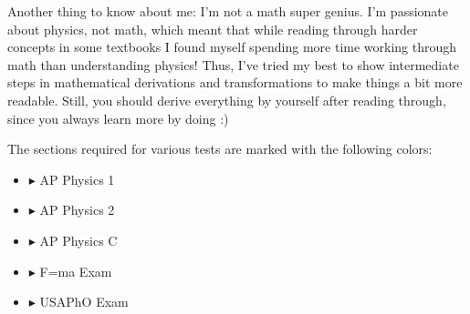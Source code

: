 \par Another thing to know about me: I'm not a math super genius. I'm passionate about physics, not math, which meant that while reading through harder concepts in some textbooks I found myself spending more time working through math than understanding physics! Thus, I've tried my best to show intermediate steps in mathematical derivations and transformations to make things a bit more readable. Still, you should derive everything by yourself after reading through, since you always learn more by doing :)
\par The sections required for various tests are marked with the following colors:
\begin{itemize}
\color{OrangeRed}
\item{$\blacktriangleright$} AP Physics 1
\color{RoyalBlue}
\item{$\blacktriangleright$} AP Physics 2
\color{PineGreen}
\item{$\blacktriangleright$} AP Physics C
\color{Goldenrod}
\item{$\blacktriangleright$} F=ma Exam
\color{Orchid}
\item{$\blacktriangleright$} USAPhO Exam
\end{itemize}

\mbox{}\linebreak
